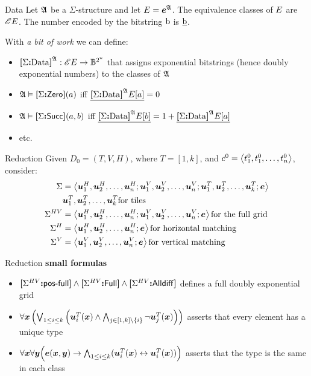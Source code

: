 \documentclass{beamer}
\begin{document}
\begin{frame}{Data}
Let $\mathfrak{A}$ be a $\Sigma$-structure and let $E = \bm{e}^{\mathfrak{A}}$.
The equivalence classes of $E$ are ${\mathscr{E}E}$.
The number encoded by the bitstring $\mathrm{b}$ is $\underline{\mathrm{b}}$.

With \emph{a bit of work} we can define:
\begin{itemize}
  \item
  ${\bm{[}\Sigma\mathord{\bm{:}}\mathrm{Data}\bm{]}}^{\mathfrak{A}} : {\mathscr{E}E} \to \mathbb{B}^{2^u}$ that assigns
  exponential bitstrings (hence doubly exponential numbers) to the classes of
  $\mathfrak{A}$
  
  \item $\mathfrak{A}\vDash{\bm{[}\Sigma\mathord{\bm{:}}\mathsf{Zero}\bm{]}}(a)$ iff
  $\underline{{\bm{[}\Sigma\mathord{\bm{:}}\mathrm{Data}\bm{]}}^{\mathfrak{A}}{E[a]}} = 0$
  
  \item $\mathfrak{A}\vDash{\bm{[}\Sigma\mathord{\bm{:}}\mathsf{Succ}\bm{]}}(a,b)$ iff
  $\underline{{\bm{[}\Sigma\mathord{\bm{:}}\mathrm{Data}\bm{]}}^{\mathfrak{A}}{E[b]}} = 1 +
  \underline{{\bm{[}\Sigma\mathord{\bm{:}}\mathrm{Data}\bm{]}}^{\mathfrak{A}}{E[a]}}$
  
  \item etc.
\end{itemize}
\end{frame}

\begin{frame}{Reduction}
Given $D_0 = (T,V,H)$, where $T = [1,k]$, and $c^0 =
\left\langle t_1^0,t_1^0,\dots,t_n^0 \right\rangle$, consider:
\begin{align*}
\Sigma &=
\left\langle \bm{u}_{1}^H,\bm{u}_{2}^H,\dots,\bm{u}_{n}^H;\bm{u}_{1}^V,\bm{u}_{2}^V,\dots,\bm{u}_{n}^V;
\bm{u}_{1}^T,\bm{u}_{2}^T,\dots,\bm{u}_{k}^T;\bm{e} \right\rangle \\
 &\bm{u}_{1}^T,\bm{u}_{2}^T,\dots,\bm{u}_{k}^T \text{for tiles} \\
\Sigma^{HV} &=
\left\langle \bm{u}_{1}^H,\bm{u}_{2}^H,\dots,\bm{u}_{n}^H;\bm{u}_{1}^V,\bm{u}_{2}^V,\dots,\bm{u}_{n}^V;\bm{e} \right\rangle
\text{for the full grid}
 \\
\Sigma^{H} &=
\left\langle \bm{u}_{1}^H,\bm{u}_{2}^H,\dots,\bm{u}_{n}^H;\bm{e} \right\rangle \text{for horizontal matching} \\
\Sigma^{V} &=
\left\langle \bm{u}_{1}^V,\bm{u}_{2}^V,\dots,\bm{u}_{n}^V;\bm{e} \right\rangle \text{for vertical matching}
\end{align*}
\end{frame}

\begin{frame}{Reduction}
\textbf{small formulas}
\begin{itemize}
  \item
  ${\bm{[}\Sigma^{HV}\mathord{\bm{:}}\mathsf{pos}{\hbox{-}}\mathsf{full}\bm{]}}\land{\bm{[}\Sigma^{HV}\mathord{\bm{:}}\mathsf{Full}\bm{]}}\land{\bm{[}\Sigma^{HV}\mathord{\bm{:}}\mathsf{Alldiff}\bm{]}}$
  defines a full doubly exponential grid
  \item $
      \forall\bm{x} \left(\bigvee_{1 \leq i \leq k} \left(\bm{u}_{i}^{T}(\bm{x})
  \land \bigwedge_{j\in[1,k]\setminus\left\{i\right\}}
  \lnot\bm{u}_{j}^{T}(\bm{x})\right)\right)$ asserts that every element has a
  unique type
  \item $\forall\bm{x}\forall\bm{y} \Big(\bm{e}(\bm{x},\bm{y}) \rightarrow
  \bigwedge_{1 \leq i \leq k} 
  (\bm{u}_{i}^{T}(\bm{x}) \leftrightarrow \bm{u}_{i}^{T}(\bm{x}))\Big)$ asserts that the type is
  the same in each class
\end{itemize}
\end{frame}
\end{document}
